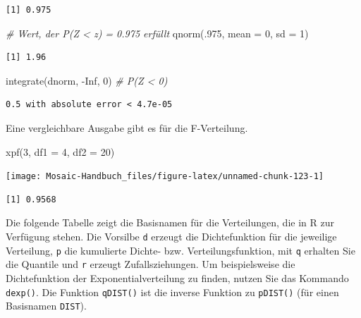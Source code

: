 \documentclass[
  ngerman,
]{scrbook}
\newenvironment{Shaded}{\begin{snugshade}}{\end{snugshade}}
\newcommand{\AttributeTok}[1]{\textcolor[rgb]{0.77,0.63,0.00}{#1}}
\newcommand{\CommentTok}[1]{\textcolor[rgb]{0.56,0.35,0.01}{\textit{#1}}}
\newcommand{\ConstantTok}[1]{\textcolor[rgb]{0.00,0.00,0.00}{#1}}
\newcommand{\DecValTok}[1]{\textcolor[rgb]{0.00,0.00,0.81}{#1}}
\newcommand{\FunctionTok}[1]{\textcolor[rgb]{0.00,0.00,0.00}{#1}}
\newcommand{\NormalTok}[1]{#1}
\newcommand{\SpecialCharTok}[1]{\textcolor[rgb]{0.00,0.00,0.00}{#1}}
\begin{document}
\begin{verbatim}
[1] 0.975
\end{verbatim}

\begin{Shaded}
\begin{Highlighting}[]
\CommentTok{\# Wert, der P(Z \textless{} z) = 0.975 erfüllt}
\FunctionTok{qnorm}\NormalTok{(.}\DecValTok{975}\NormalTok{, }\AttributeTok{mean =} \DecValTok{0}\NormalTok{, }\AttributeTok{sd =} \DecValTok{1}\NormalTok{)}
\end{Highlighting}
\end{Shaded}

\begin{verbatim}
[1] 1.96
\end{verbatim}

\begin{Shaded}
\begin{Highlighting}[]
\FunctionTok{integrate}\NormalTok{(dnorm, }\SpecialCharTok{{-}}\ConstantTok{Inf}\NormalTok{, }\DecValTok{0}\NormalTok{) }\CommentTok{\# P(Z \textless{} 0)}
\end{Highlighting}
\end{Shaded}

\begin{verbatim}
0.5 with absolute error < 4.7e-05
\end{verbatim}

Eine vergleichbare Ausgabe gibt es für die F-Verteilung.

\begin{Shaded}
\begin{Highlighting}[]
\FunctionTok{xpf}\NormalTok{(}\DecValTok{3}\NormalTok{, }\AttributeTok{df1 =} \DecValTok{4}\NormalTok{, }\AttributeTok{df2 =} \DecValTok{20}\NormalTok{)}
\end{Highlighting}
\end{Shaded}

\begin{center}\texttt{[image: Mosaic-Handbuch\_files/figure-latex/unnamed-chunk-123-1]} \end{center}

\begin{verbatim}
[1] 0.9568
\end{verbatim}

Die folgende Tabelle zeigt die Basisnamen für die Verteilungen, die in \textsf{R} zur Verfügung stehen. Die Vorsilbe \texttt{d} erzeugt die Dichtefunktion für die jeweilige Verteilung, \texttt{p} die kumulierte Dichte- bzw. Verteilungsfunktion, mit \texttt{q} erhalten Sie die Quantile und \texttt{r} erzeugt Zufallsziehungen. Um beispielsweise die Dichtefunktion der Exponentialverteilung zu finden, nutzen Sie das Kommando \texttt{dexp()}. Die Funktion \texttt{qDIST()} ist die inverse Funktion zu \texttt{pDIST()} (für einen Basisnamen \texttt{DIST}).
\end{document}
